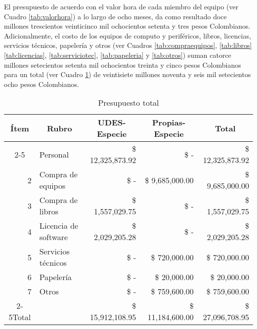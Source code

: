El presupuesto de acuerdo con el valor hora de cada miembro del equipo (ver Cuadro \ref{tab:valorhora}) a lo largo de ocho meses, da como resultado doce millones trescientos veinticinco mil ochocientos setenta y tres pesos Colombianos. Adicionalmente, el costo  de los equipos de computo y periféricos, libros, licencias, servicios técnicos, papelería y otros (ver Cuadros \ref{tab:compraequipos}, \ref{tab:libros} \ref{tab:licencias}, \ref{tab:serviciotec}, \ref{tab:papeleria} y \ref{tab:otros}) suman catorce millones setecientos setenta mil ochocientos treinta y cinco pesos Colombianos para un total (ver Cuadro \ref{tab:presupuesto}) de veintisiete millones noventa y seis mil setecientos ocho pesos Colombianos.

\begin{table}[H]
    \centering
    \caption{Presupuesto total}
    \footnotesize
    \begin{tabular}{crrrr}
        \hline
        Ítem & \multicolumn{1}{c}{Rubro} & \multicolumn{1}{c}{UDES-Especie} & \multicolumn{1}{c}{Propias-Especie} & \multicolumn{1}{c}{Total} \bigstrut\\
        \cline{2-5}\multicolumn{1}{r}{1} & \multicolumn{1}{l}{Personal} &  \$     12,325,873.92  &  \$                           -    &  \$     12,325,873.92  \bigstrut[t]\\
        \multicolumn{1}{r}{2} & \multicolumn{1}{l}{Compra de equipos} &  \$                           -    &  \$       9,685,000.00  &  \$       9,685,000.00  \\
        \multicolumn{1}{r}{3} & \multicolumn{1}{l}{Compra de libros} &  \$       1,557,029.75  &  \$                           -    &  \$       1,557,029.75  \\
        \multicolumn{1}{r}{4} & \multicolumn{1}{l}{Licencia de software} &  \$       2,029,205.28  &  \$                           -    &  \$       2,029,205.28  \\
        \multicolumn{1}{r}{5} & \multicolumn{1}{l}{Servicios técnicos} &  \$                           -    &  \$          720,000.00  &  \$          720,000.00  \\
        \multicolumn{1}{r}{6} & \multicolumn{1}{l}{Papelería} &  \$                           -    &  \$             20,000.00  &  \$             20,000.00  \\
        \multicolumn{1}{r}{7} & \multicolumn{1}{l}{Otros} &  \$                           -    &  \$          759,600.00  &  \$          759,600.00  \bigstrut[b]\\
        \cline{2-5}Total &   &  \$     15,912,108.95  &  \$     11,184,600.00  &  \$     27,096,708.95  \bigstrut\\
        \hline
    \end{tabular}%
  \label{tab:presupuesto}%
\end{table}%

